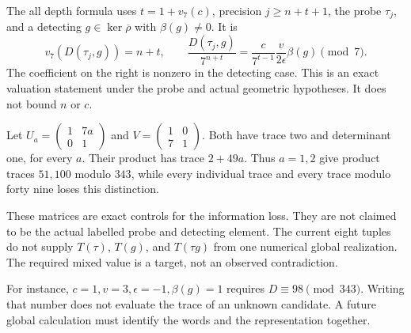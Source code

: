 The all depth formula uses $t=1+v_7(c)$, precision $j\ge n+t+1$, the probe $\tau_j$, and a detecting $g\in\ker\overline\rho$ with $\beta(g)\ne0$. It is
\[
v_7(D(\tau_j,g))=n+t,
\qquad
\frac{D(\tau_j,g)}{7^{n+t}}
=\frac{c}{7^{t-1}}\frac{v}{2\epsilon}\beta(g)\pmod7.
\]
The coefficient on the right is nonzero in the detecting case. This is an exact valuation statement under the probe and actual geometric hypotheses. It does not bound $n$ or $c$.

\begin{example}
Let $U_a=\left(\begin{smallmatrix}1&7a\\0&1\end{smallmatrix}\right)$ and $V=\left(\begin{smallmatrix}1&0\\7&1\end{smallmatrix}\right)$. Both have trace two and determinant one, for every $a$. Their product has trace $2+49a$. Thus $a=1,2$ give product traces $51,100$ modulo $343$, while every individual trace and every trace modulo forty nine loses this distinction.
\end{example}
These matrices are exact controls for the information loss. They are not claimed to be the actual labelled probe and detecting element. The current eight tuples do not supply $T(\tau)$, $T(g)$, and $T(\tau g)$ from one numerical global realization. The required mixed value is a target, not an observed contradiction.

For instance, $c=1,v=3,\epsilon=-1,\beta(g)=1$ requires $D\equiv98\pmod{343}$. Writing that number does not evaluate the trace of an unknown candidate. A future global calculation must identify the words and the representation together.
